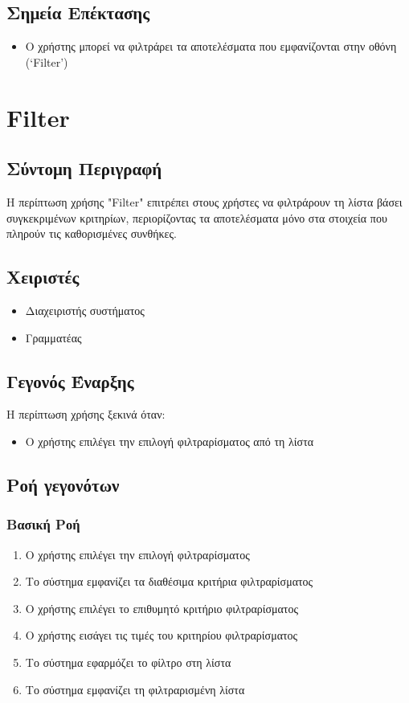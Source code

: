 \documentclass[12pt,a4paper,twoside]{book}
\begin{document}
\subsection{Σημεία Επέκτασης}
\begin{itemize}
  \item Ο χρήστης μπορεί να φιλτράρει τα αποτελέσματα που εμφανίζονται στην οθόνη (`Filter') %
\end{itemize}

\section{Filter}

\subsection{Σύντομη Περιγραφή}
Η περίπτωση χρήσης "Filter" επιτρέπει στους χρήστες να φιλτράρουν τη λίστα βάσει συγκεκριμένων κριτηρίων, περιορίζοντας τα αποτελέσματα μόνο στα στοιχεία που πληρούν τις καθορισμένες συνθήκες. %

\subsection{Χειριστές}
\begin{itemize}
  \item Διαχειριστής συστήματος
  \item Γραμματέας
\end{itemize}

\subsection{Γεγονός Έναρξης}
Η περίπτωση χρήσης ξεκινά όταν:
\begin{itemize}
  \item Ο χρήστης επιλέγει την επιλογή φιλτραρίσματος από τη λίστα %
\end{itemize}

\subsection{Ροή γεγονότων}

\subsubsection{Βασική Ροή}
\begin{enumerate}
  \item Ο χρήστης επιλέγει την επιλογή φιλτραρίσματος
  \item Το σύστημα εμφανίζει τα διαθέσιμα κριτήρια φιλτραρίσματος%
  \item Ο χρήστης επιλέγει το επιθυμητό κριτήριο φιλτραρίσματος
  \item Ο χρήστης εισάγει τις τιμές του κριτηρίου φιλτραρίσματος
  \item Το σύστημα εφαρμόζει το φίλτρο στη λίστα
  \item Το σύστημα εμφανίζει τη φιλτραρισμένη λίστα
\end{enumerate}
\end{document}
